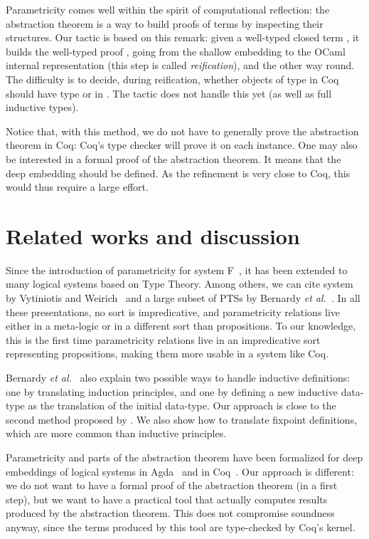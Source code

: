 \documentclass[a4paper,USenglish]{lipics}
\def\coq{\textsf{Coq}\xspace}
\def\cicr{\xspace}
\def\agda{\textsf{Agda}\xspace}
\def\ocaml{\textsf{OCaml}\xspace}
\begin{document}
Parametricity comes well within the spirit of computational reflection:
the abstraction theorem is a way to build proofs of terms by inspecting
their structures. Our tactic is based on this remark: given a well-typed
closed term , it builds the well-typed proof , going from the
shallow embedding to the \ocaml internal representation (this step is
called \emph{reification}), and the other way round. The difficulty is
to decide, during reification, whether objects of type  in \coq
should have type  or  in \cicr. The tactic does not handle
this yet (as well as full inductive types).

Notice that, with this method, we do not have to generally prove the
abstraction theorem in \coq: \coq's type checker will prove it on each
instance. One may also be interested in a formal proof of the abstraction
theorem. It means that the deep embedding should be defined. As the
refinement is very close to \coq, this would thus require a large
effort.


\section{Related works and discussion}

Since the introduction of parametricity for system
F~\cite{DBLP:conf/ifip/Reynolds83,Wadler89}, it has been
extended to many logical systems based on Type Theory. Among others, we
can cite system  by Vytiniotis and
Weirich~\cite{VytiniotisW10} and a large subset of PTSs by
Bernardy \emph{et al.}~\cite{DBLP:conf/icfp/BernardyJP10,DBLP:conf/fossacs/BernardyL11}.
In all these presentations, no sort is impredicative, and parametricity
relations live either in a meta-logic or in a different sort than
propositions. To our knowledge, this is the first time parametricity
relations live in an impredicative sort representing propositions,
making them more usable in a system like \coq.

Bernardy \emph{et al.}~\cite{DBLP:conf/icfp/BernardyJP10} also explain two possible ways to
handle inductive definitions: one by translating induction principles,
and one by defining a new inductive data-type as the translation of the
initial data-type. Our approach is close to the second method proposed
by \cite{DBLP:conf/icfp/BernardyJP10}. We also show how to translate
fixpoint definitions, which are more common than inductive principles.

Parametricity and parts of the abstraction theorem have been formalized
for deep embeddings of logical systems in
\agda~\cite{DBLP:conf/icfp/BernardyJP10} and in
\coq~\cite{DBLP:conf/tlca/Atkey09,Atkey09b}. Our approach is different:
we do not want to have a formal proof of the abstraction theorem (in a
first step), but we want to have a practical tool that actually computes
results produced by the abstraction theorem. This does not compromise
soundness anyway, since the terms produced by this tool are type-checked
by \coq's kernel.
\end{document}
